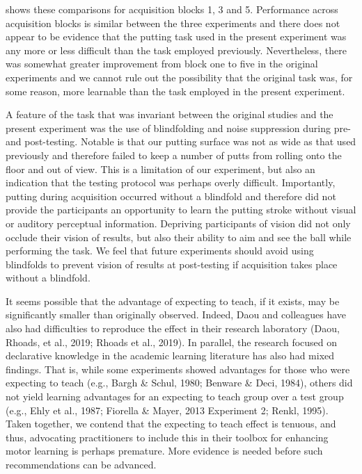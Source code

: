 \documentclass[
  english,
  man,floatsintext]{apa7}
\begin{document}
\noindent shows these comparisons for acquisition blocks 1, 3 and 5. Performance across acquisition blocks is similar between the three experiments and there does not appear to be evidence that the putting task used in the present experiment was any more or less difficult than the task employed previously. Nevertheless, there was somewhat greater improvement from block one to five in the original experiments and we cannot rule out the possibility that the original task was, for some reason, more learnable than the task employed in the present experiment.

A feature of the task that was invariant between the original studies and the present experiment was the use of blindfolding and noise suppression during pre- and post-testing. Notable is that our putting surface was not as wide as that used previously and therefore failed to keep a number of putts from rolling onto the floor and out of view. This is a limitation of our experiment, but also an indication that the testing protocol was perhaps overly difficult. Importantly, putting during acquisition occurred without a blindfold and therefore did not provide the participants an opportunity to learn the putting stroke without visual or auditory perceptual information. Depriving participants of vision did not only occlude their vision of results, but also their ability to aim and see the ball while performing the task. We feel that future experiments should avoid using blindfolds to prevent vision of results at post-testing if acquisition takes place without a blindfold.

It seems possible that the advantage of expecting to teach, if it exists, may be significantly smaller than originally observed. Indeed, Daou and colleagues have also had difficulties to reproduce the effect in their research laboratory (Daou, Rhoads, et al., 2019; Rhoads et al., 2019). In parallel, the research focused on declarative knowledge in the academic learning literature has also had mixed findings. That is, while some experiments showed advantages for those who were expecting to teach (e.g., Bargh \& Schul, 1980; Benware \& Deci, 1984), others did not yield learning advantages for an expecting to teach group over a test group (e.g., Ehly et al., 1987; Fiorella \& Mayer, 2013 Experiment 2; Renkl, 1995). Taken together, we contend that the expecting to teach effect is tenuous, and thus, advocating practitioners to include this in their toolbox for enhancing motor learning is perhaps premature. More evidence is needed before such recommendations can be advanced.
\end{document}
